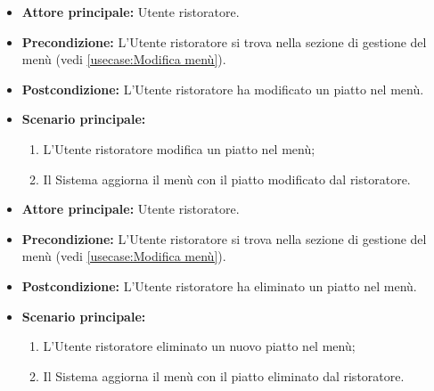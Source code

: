 \label{usecase:Modifica piatto}
\begin{itemize}

	\item \textbf{Attore principale:} Utente ristoratore.

	\item \textbf{Precondizione:} L'Utente ristoratore si trova nella sezione di gestione del menù (vedi \autoref{usecase:Modifica menù}).

	\item \textbf{Postcondizione:} L'Utente ristoratore ha modificato un piatto nel menù.

	\item \textbf{Scenario principale:}
	\begin{enumerate}
		\item L'Utente ristoratore modifica un piatto nel menù;
		\item Il Sistema aggiorna il menù con il piatto modificato dal ristoratore.
	\end{enumerate}

\end{itemize}


\label{usecase:Eliminazione piatto}
\begin{itemize}

	\item \textbf{Attore principale:} Utente ristoratore.

	\item \textbf{Precondizione:} L'Utente ristoratore si trova nella sezione di gestione del menù (vedi \autoref{usecase:Modifica menù}).

	\item \textbf{Postcondizione:} L'Utente ristoratore ha eliminato un piatto nel menù.

	\item \textbf{Scenario principale:}
	\begin{enumerate}
		\item L'Utente ristoratore eliminato un nuovo piatto nel menù;
		\item Il Sistema aggiorna il menù con il piatto eliminato dal ristoratore.
	\end{enumerate}

\end{itemize}
